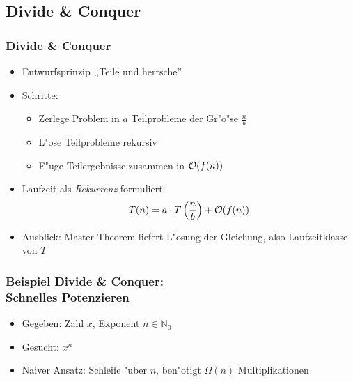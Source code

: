 \subsection{Divide \& Conquer}
\begin{frame}
  \frametitle{Divide \& Conquer}
  \begin{itemize}
  \item Entwurfsprinzip ,,Teile und herrsche''
  \item Schritte:
    \begin{itemize}
    \item Zerlege Problem in $a$ Teilprobleme der Gr"o"se $\frac{n}{b}$
    \item L"ose Teilprobleme rekursiv
    \item F"uge Teilergebnisse zusammen in $\mathcal{O}(f(n))$
    \end{itemize}
  \item Laufzeit als \emph{Rekurrenz} formuliert:
    \[T(n) = a\cdot T\left(\frac{n}{b}\right) + \mathcal{O}(f(n))\]
  \item Ausblick: Master-Theorem liefert L"osung der Gleichung, also Laufzeitklasse von
        $T$
  \end{itemize}
\end{frame}

\begin{frame}
  \frametitle{Beispiel Divide \& Conquer: \\ Schnelles Potenzieren}
  \begin{itemize}
  \item Gegeben: Zahl $x$, Exponent $n \in \mathbb{N}_0$
  \item Gesucht: $x^n$
  \item Naiver Ansatz: Schleife "uber $n$, ben"otigt $\Omega(n)$ Multiplikationen
  \end{itemize}
\end{frame}

